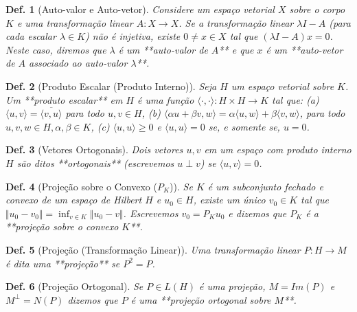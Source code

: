\documentclass[11pt]{article}
\theoremstyle{yellowhead}
\theoremstyle{yellowdef}
\newtheorem*{definition}{Def.}
\begin{document}
\begin{multicols}{3}
    \begin{definition}[Auto-valor e Auto-vetor]
Considere um espaço vetorial $X$ sobre o corpo $K$ e uma transformação linear $A : X \rightarrow X$. Se a transformação linear $\lambda I - A$ (para cada escalar $\lambda \in K$) não é injetiva, existe $0 \ne x \in X$ tal que $(\lambda I - A)x = 0$. Neste caso, diremos que $\lambda$ é um **auto-valor de $A$** e que $x$ é um **auto-vetor de $A$ associado ao auto-valor $\lambda$**.
\end{definition}

\begin{definition}[Produto Escalar (Produto Interno)]
Seja $H$ um espaço vetorial sobre $K$. Um **produto escalar** em $H$ é uma função $\langle \cdot, \cdot \rangle : H \times H \rightarrow K$ tal que: (a) $\langle u, v \rangle = \overline{\langle v, u \rangle}$ para todo $u, v \in H$, (b) $\langle \alpha u + \beta v, w \rangle = \alpha \langle u, w \rangle + \beta \langle v, w \rangle$, para todo $u, v, w \in H, \alpha, \beta \in K$, (c) $\langle u, u \rangle \ge 0$ e $\langle u, u \rangle = 0$ se, e somente se, $u = 0$.
\end{definition}

\begin{definition}[Vetores Ortogonais]
Dois vetores $u, v$ em um espaço com produto interno $H$ são ditos **ortogonais** (escrevemos $u \perp v$) se $\langle u, v \rangle = 0$.
\end{definition}

\begin{definition}[Projeção sobre o Convexo ($P_K$)]
Se $K$ é um subconjunto fechado e convexo de um espaço de Hilbert $H$ e $u_0 \in H$, existe um único $v_0 \in K$ tal que $\Vert u_0 - v_0 \Vert = \inf_{v \in K} \Vert u_0 - v \Vert$. Escrevemos $v_0 = P_K u_0$ e dizemos que $P_K$ é a **projeção sobre o convexo $K$**.
\end{definition}

\begin{definition}[Projeção (Transformação Linear)]
Uma transformação linear $P : H \rightarrow M$ é dita uma **projeção** se $P^2 = P$.
\end{definition}

\begin{definition}[Projeção Ortogonal]
Se $P \in L(H)$ é uma projeção, $M = Im(P)$ e $M^{\perp} = N(P)$ dizemos que $P$ é uma **projeção ortogonal sobre $M$**.
\end{definition}


\end{multicols}
\end{document}
